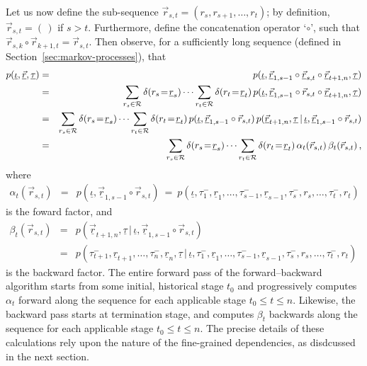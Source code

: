 \documentclass[a4paper]{article}
\newcommand{\ui}{\underline{\iota}}
\newcommand{\ut}{\underline{\tau}}
\newcommand{\ur}{\underline{r}}
\newcommand{\vr}{\vec{r}}
\newcommand{\uvr}{\underline{\vr}}
\newcommand{\tm}{\tau^{-}}
\begin{document}
Let us now define the sub-sequence $\vr_{s,t}=(r_s,r_{s+1},\ldots,r_t)$; by definition,
$\vr_{s,t}=(\,)$ if $s>t$. Furthermore, define the concatenation operator `$\circ$', such that
$\vr_{s,k}\circ\vr_{k+1,t}=\vr_{s,t}$.
Then observe, for a sufficiently long sequence (defined in Section~\ref{sec:markov-processes}), that
\begin{eqnarray}
p(\ui,\uvr,\ut) 
& = &
p(\ui,\uvr_{1,s-1}\circ\uvr_{s,t}\circ\uvr_{t+1,n},\ut)
\nonumber\\
& = &
\sum_{r_s\in{\cal R}} \delta(r_s\!=\!\ur_s)
\cdots\sum_{r_t\in{\cal R}} \delta(r_t\!=\!\ur_t)
\,p(\ui,\uvr_{1,s-1}\circ\vr_{s,t}\circ\uvr_{t+1,n},\ut)
\nonumber\\
& = &
\sum_{r_s\in{\cal R}} \delta(r_s\!=\!\ur_s)
\cdots\sum_{r_t\in{\cal R}} \delta(r_t\!=\!\ur_t)
\,p(\ui,\uvr_{1,s-1}\circ\vr_{s,t})
\,p(\uvr_{t+1,n},\ut\,|\,\ui,\uvr_{1,s-1}\circ\vr_{s,t})
\nonumber\\
& = &
\sum_{r_s\in{\cal R}} \delta(r_s\!=\!\ur_s)
\cdots\sum_{r_t\in{\cal R}} \delta(r_t\!=\!\ur_t)
\,\alpha_t(\vr_{s,t})\,\beta_t(\vr_{s,t})\,,
\end{eqnarray}
where
\begin{eqnarray}
\alpha_t(\vr_{s,t}) & = & p(\ui,\uvr_{1,s-1}\circ\vr_{s,t})~=~p(\ui,\tau_1^-,\ur_1,\ldots,\tm_{s-1},\ur_{s-1},
\tm_s,r_s,\ldots,\tm_t,r_t)
\label{eq:fwd-pass-basic}
\end{eqnarray}
is the foward factor,
and
\begin{eqnarray}
\beta_t(\vr_{s,t}) & = & p(\uvr_{t+1,n},\ut\,|\,\ui,\uvr_{1,s-1}\circ\vr_{s,t})
\nonumber\\& = &
p(\tm_{t+1},\ur_{t+1},\ldots,\tm_n,\ur_n,\ut\,|\,\ui,\tau_1^-,\ur_1,\ldots,\tm_{s-1},\ur_{s-1},
\tm_s,r_s,\ldots,\tm_t,r_t)\
\label{eq:bwd-pass-basic}
\end{eqnarray}
is the backward factor.
The entire forward pass of the forward--backward algorithm starts from some initial, historical stage $t_0$ and
progressively computes $\alpha_t$ forward along the sequence for each applicable stage $t_0\le t\le n$. Likewise,
the backward pass starts at termination stage, and computes $\beta_t$
backwards along the sequence for each applicable stage $t_0\le t\le n$. The precise details of these calculations rely upon
the nature of the fine-grained dependencies, as disdcussed in the next section.

\end{document}
